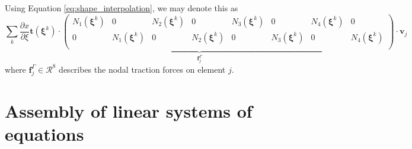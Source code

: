 Using Equation \eqref{eq:shape_interpolation}, we may denote this as 
\setlength\arraycolsep{-5pt}
\begin{equation}
    \underbrace{\sum_k \frac{\partial x}{\partial \xi} \mathbf{t}(\pmb{\xi}^k) \cdot
    \begin{pmatrix}
            N_1(\pmb{\xi}^k) & 0 & N_2(\pmb{\xi}^k) & 0 & N_3(\pmb{\xi}^k) & 0 & N_4(\pmb{\xi}^k) & 0\\
            0 & N_1(\pmb{\xi}^k) & 0 & N_2(\pmb{\xi}^k) & 0 & N_3(\pmb{\xi}^k) & 0 & N_4(\pmb{\xi}^k)\\
    \end{pmatrix}}_{\mathbf{f}^\Gamma_j}
    \cdot 
    \mathbf{v}_j
\end{equation}
\setlength\arraycolsep{5pt}
where $\mathbf{f}^\Gamma_j \in \mathcal{R}^8$ describes the nodal traction forces on element $j$. 

\section{Assembly of linear systems of equations}

